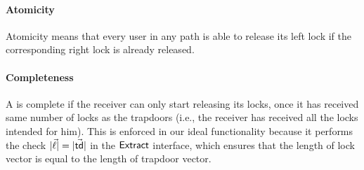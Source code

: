 \paragraph{Atomicity} Atomicity means that every user in any path is able to release its left 
lock if the corresponding right lock is already released. 

\paragraph{Completeness} A \sysname is complete if the receiver can only start releasing its 
locks, once it has received same number of locks as the trapdoors (i.e., the receiver has 
received all the locks intended for him). This is enforced in our ideal functionality because 
it performs the check $|\vec{\ell}| = |\vec{\mathsf{td}}|$ in the $\mathsf{Extract}$ interface, which ensures 
that the length of lock vector is equal to the length of trapdoor vector.

